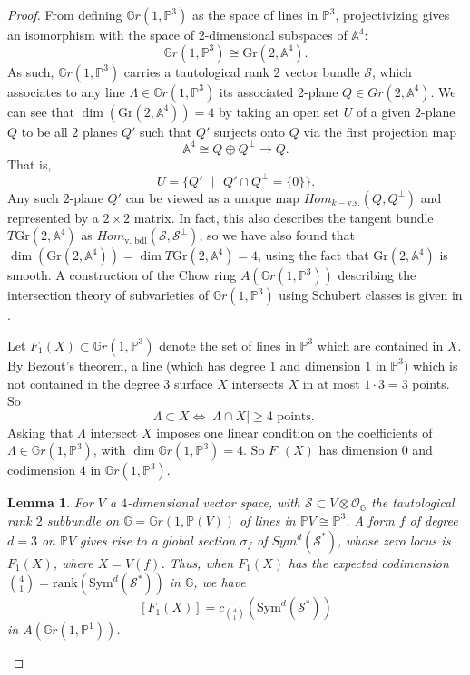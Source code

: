 \documentclass{amsart}
\newtheorem{lemma}[theorem]{Lemma}
\newcommand{\PP}{\mathbb{P}}\newcommand{\A}{\mathbb{A}}\newcommand{\Z}{\mathbb{Z}}\newcommand{\C}{\mathbb{C}}\newcommand{\N}{\mathbb{N}}\newcommand{\T}{\mathbb{T}}
\begin{document}
\begin{proof} 

From defining $\mathbb{G}r(1,\PP^3)$ as the space of lines in $\PP^3$, projectivizing gives an isomorphism with the space of $2$-dimensional subspaces of $\A^4$: \[\mathbb{G}r(1, \PP^3) \cong \text{Gr}(2,\A^4). \] As such, $\mathbb{G}r(1,\PP^3)$ carries a tautological rank $2$ vector bundle $\mathcal{S}$, which associates to any line $\Lambda \in \mathbb{G}r(1,\PP^3)$ its associated 2-plane $Q\in Gr(2,\A^4)$. We can see that $\dim(\text{Gr}(2,\A^4))=4$ by taking an open set $U$ of a given $2$-plane $Q$ to be all $2$ planes $Q'$ such that $Q'$ surjects onto $Q$ via the first projection map $$\A^4 \cong Q \oplus Q^\perp \rightarrow Q.$$ That is, \[ U = \{ Q' \text{ }|\text{ } Q' \cap Q^\perp = \{0\} \}. \] Any such $2$-plane $Q'$ can be viewed as a unique map $Hom_{k-\text{v.s.}}(Q,Q^\perp)$ and represented by a $2\times 2$ matrix. In fact, this also describes the tangent bundle $T \text{Gr}(2,\A^4)$ as $Hom_{\text{v. bdl}}(\mathcal{S}, \mathcal{S}^\perp)$, so we have also found that $\dim ( \text{Gr}(2, \A^4))= \dim T\text{Gr}(2,\A^4) = 4$, using the fact that $\text{Gr}(2,\A^4)$ is smooth. A construction of the Chow ring $A(\mathbb{G}r(1,\PP^3))$ describing the intersection theory of subvarieties of $\mathbb{G}r(1,\PP^3)$ using Schubert classes is given in \cite{eisenbud20163264}.  

 Let $F_1(X) \subset \mathbb{G}r(1,\PP^3)$ denote the set of lines in $\PP^3$ which are contained in $X$. By Bezout's theorem, a line (which has degree $1$ and dimension $1$ in $\PP^3$) which is not contained in the degree $3$ surface $X$ intersects $X$ in at most $1\cdot 3=3$ points. So \[ \Lambda \subset X \iff |\Lambda \cap X | \geq 4 \text{ points. }\] Asking that $\Lambda$ intersect $X$ imposes one linear condition on the coefficients of $\Lambda \in \mathbb{G}r(1, \PP^3)$, with $\dim \mathbb{G}r(1,\PP^3)=4$. So $F_1(X)$ has dimension $0$ and codimension $4$ in $\mathbb{G}r(1,\PP^3)$. \\

 \begin{lemma}
     For $V$ a $4$-dimensional vector space, with $\mathcal{S} \subset V \otimes \mathcal{O}_\mathbb{G}$ the tautological rank $2$ subbundle on $\mathbb{G}=\mathbb{G}r(1,\PP(V))$ of lines in $\PP V \cong \PP^3$. A form $f$ of degree $d=3$ on $\PP V$ gives rise to a global section $\sigma_f$ of $Sym^d(\mathcal{S}^*)$, whose zero locus is $F_1(X)$, where $X = V(f)$. Thus, when $F_1(X)$ has the expected codimension $\binom{4}{1} = \text{rank}(\text{Sym}^d(\mathcal{S}^*))$ in $\mathbb{G}$, we have \[ [ F_1(X)] = c_{\binom{4}{1}}\left(\text{Sym}^d(\mathcal{S}^*)\right) \] in $A(\mathbb{G}r(1,\PP^1))$. 
 \end{lemma}


\end{proof}
\end{document}
